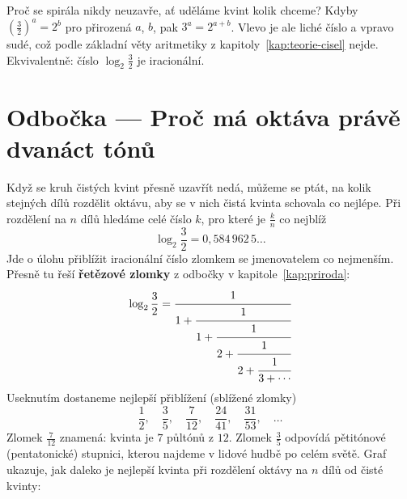 \begin{note}
  Proč se spirála nikdy neuzavře, ať uděláme kvint kolik chceme? Kdyby ${\left(\frac{3}{2}\right)}^a = 2^b$ pro přirozená $a$, $b$, pak $3^a = 2^{a+b}$. Vlevo je ale liché číslo a vpravo sudé, což podle základní věty aritmetiky z kapitoly~\ref{kap:teorie-cisel} nejde. Ekvivalentně: číslo $\log_2\frac{3}{2}$ je iracionální.
\end{note}

\section{Odbočka --- Proč má oktáva právě dvanáct tónů}

Když se kruh čistých kvint přesně uzavřít nedá, můžeme se ptát, na kolik stejných dílů rozdělit oktávu, aby se v nich čistá kvinta schovala co nejlépe. Při rozdělení na $n$ dílů hledáme celé číslo $k$, pro které je $\frac{k}{n}$ co nejblíž
\begin{equation*}
  \log_2\frac{3}{2} = 0{,}584\,962\,5\ldots
\end{equation*}
Jde o úlohu přiblížit iracionální číslo zlomkem se jmenovatelem co nejmenším. Přesně tu řeší \textbf{řetězové zlomky} z odbočky v kapitole~\ref{kap:priroda}:
\begin{equation*}
  \log_2\frac{3}{2} = \cfrac{1}{1 + \cfrac{1}{1 + \cfrac{1}{2 + \cfrac{1}{2 + \cfrac{1}{3 + \cdots}}}}}
\end{equation*}
Useknutím dostaneme nejlepší přiblížení (sblížené zlomky)
\begin{equation*}
  \frac{1}{2},\quad\frac{3}{5},\quad\frac{7}{12},\quad\frac{24}{41},\quad\frac{31}{53},\quad\dots
\end{equation*}
Zlomek $\frac{7}{12}$ znamená: kvinta je $7$ půltónů z $12$. Zlomek $\frac{3}{5}$ odpovídá pětitónové (pentatonické) stupnici, kterou najdeme v lidové hudbě po celém světě. Graf ukazuje, jak daleko je nejlepší kvinta při rozdělení oktávy na $n$ dílů od čisté kvinty:

\begin{center}
\end{center}

